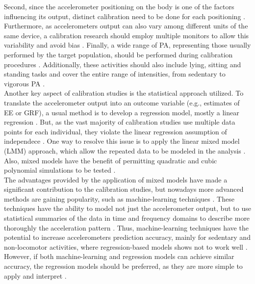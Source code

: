 \documentclass[11pt]{article}
\begin{document}
Second, since the accelerometer positioning on the body is one of the factors influencing its output, distinct calibration need to be done for each positioning \cite{Welk_2005}. Furthermore, as accelerometers output can also vary among different units of the same device, a calibration research should employ multiple monitors to allow this variability and avoid bias \cite{Welk_2005}. Finally, a wide range of PA, representing those usually performed by the target population, should be performed during calibration procedures \cite{Welk_2005, Basset_2012}. Additionally, these activities should also include lying, sitting and standing tasks and cover the entire range of intensities, from sedentary to vigorous PA \cite{Basset_2012}. \\

Another key aspect of calibration studies is the statistical approach utilized. To translate the accelerometer output into an outcome variable (e.g., estimates of EE or GRF), a usual method is to develop a regression model, mostly a linear regression \cite{Montoye_2017}. But, as the vast majority of calibration studies use multiple data points for each individual, they violate the linear regression assumption of independece \cite{Welk_2005, Field_2012}. One way to resolve this issue is to apply the linear mixed model (LMM) approach, which allow the repeated data to be modeled in the analysis \cite{Field_2012}. Also, mixed models have the benefit of permitting quadratic and cubic polynomial simulations to be tested \cite{Field_2012}. \\

The advantages provided by the application of mixed models have made a significant contribution to the calibration studies, but nowadays more advanced methods are gaining popularity, such as machine-learning techniques \cite{Montoye_2017, Troiano_2014}. These techniques have the ability to model not just the accelerometer output, but to use statistical summaries of the data in time and frequency domains to describe more thoroughly the acceleration pattern \cite{Staudenmayer_2015, Farrahi_2019}. Thus, machine-learning techniques have the potential to increase accelerometers prediction accuracy, mainly for sedentary and non-locomotor activities, where regression-based models shows not to work well \cite{Montoye_2017}. However, if both machine-learning and regression models can achieve similar accuracy, the regression models should be preferred, as they are more simple to apply and interpret \cite{Montoye_2017}. \\
\end{document}
